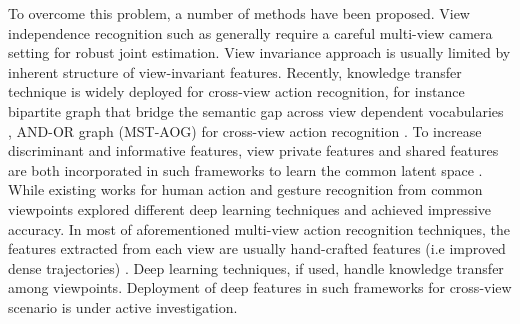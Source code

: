         To overcome this problem, a number of methods have been proposed. View independence recognition such as \cite{gavrila19963, lv2007single, weinland2007action, weinland2011survey} generally require a careful multi-view camera setting for robust joint estimation. View invariance approach \cite{junejo2008cross, li2012cross} is usually limited by inherent structure of view-invariant features. Recently, knowledge transfer technique is widely deployed for cross-view action recognition, for instance bipartite graph that bridge the semantic gap across view dependent vocabularies \cite{liu2011cross}, AND-OR graph (MST-AOG) for cross-view action recognition \cite{wang2014cross}. To increase discriminant and informative features, view private features and shared features are both incorporated in such frameworks to learn the common latent space \cite{kong2017deeply, liu2018hierarchically}. 
        While existing works for human action and gesture recognition from common viewpoints explored different deep learning techniques and achieved impressive accuracy. In most of aforementioned multi-view action recognition techniques, the features extracted from each view are usually hand-crafted features (i.e improved dense trajectories) \cite{rahmani2017learning, liu2018hierarchically,kong2017deeply}. Deep learning techniques, if used, handle knowledge transfer among viewpoints. Deployment of deep features in such frameworks for cross-view scenario is under active investigation.
